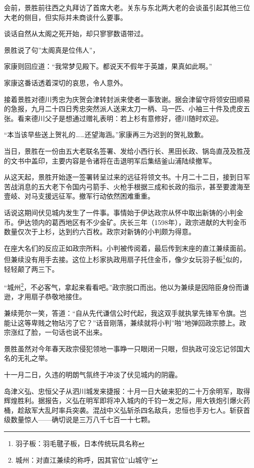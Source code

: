 \documentclass[
]{article}
\begin{document}
会前，景胜前往西之丸拜访了首席大老。关东与东北两大老的会谈虽引起其他三位大老的侧目，但实际并未商谈什么要事。

谈话自然从太阁之死开始，却只寥寥数语带过。

景胜说了句''太阁真是位伟人''，

家康则回应道：``我常梦见殿下。都说天不假年于英雄，果真如此啊。''

家康这番话透着深切的哀思，令人意外。

接着景胜对德川秀忠为庆贺会津转封派来使者一事致谢。据会津留守将领安田顺易的急报，九月二十四日秀忠突然派人送来太刀一柄、马一匹、小袖三十件及虎皮五张。看来德川父子是想通过赠礼表明：若上杉有意修好，德川随时欢迎。

``本当该早些送上贺礼的\ldots\ldots 还望海涵。''家康再三为迟到的贺礼致歉。

当日，景胜在一份由五大老联名签署、发给小西行长、黑田长政、锅岛直茂及胜茂的文书中盖印，主要内容是令诸将在击退明军后集结釜山浦陆续撤军。

从这天起，景胜开始逐一签署转呈过来的远征将领文书。十月二十二日，接到日军苦战消息的五大老下令国内弓箭手、火枪手根据三成和长政的指示，甚至要渡海至壹岐、对马支援远征军。撤军行动依然困难重重。

话说这期间伏见城内发生了一件事。事情始于伊达政宗从怀中取出新铸的小判金币。伊达领内的葛西地区有不少金矿。庆长三年（1598年），政宗进献的大判金币数量仅次于上杉，达到约六百枚。政宗对新铸的小判颇为得意。

在座大名们的反应正如政宗所料。小判被传阅着，最后传到末座的直江兼续面前。但兼续没有用手去接。这位上杉家执政用扇子托住金币，像少女玩羽子板\footnote{羽子板：羽毛毽子板，日本传统玩具名称}似的，轻轻颠了两三下。

``城州\footnote{城州：对直江兼续的称呼，因其官位''山城守''}，不必客气，拿起来看看吧。''政宗脱口而出。他以为兼续是因陪臣身份而谦逊，才用扇子恭敬地接住。

兼续莞尔一笑，答道：``自从先代谦信公时代起，我这双手就执掌先锋军令旗。岂能让这等卑贱之物玷污了它？''话音刚落，兼续就将小判''啪''地弹回政宗膝上。政宗涨红了脸，一句话也说不出来。

景胜虽然对今年春天政宗侵犯领地一事睁一只眼闭一只眼，但执政可没忘记邻国大名的无礼之举。

十一月二日，久违的明朗气氛终于冲淡了伏见城内的阴霾。

岛津义弘、忠恒父子从泗川城发来捷报：十月一日大破来犯的二十万余明军，取得辉煌胜利。据报告，义弘在明军即将冲入城内的千钧一发之际，用大铁炮引爆火药桶，趁敌军大乱时率兵突袭。混战中义弘斩杀四名敌兵，忠恒也手刃七人。斩获首级数量惊人------确切说是三万八千七百一十七颗。
\end{document}

